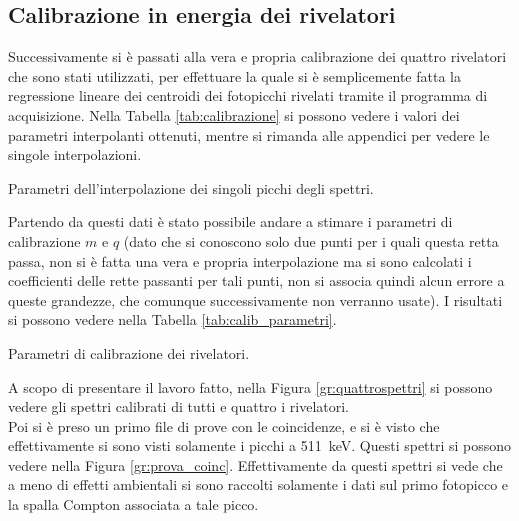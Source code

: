 \subsection{Calibrazione in energia dei rivelatori}

Successivamente si è passati alla vera e propria calibrazione dei quattro rivelatori che sono stati utilizzati, per effettuare la quale si è semplicemente fatta la regressione
lineare dei centroidi dei fotopicchi rivelati tramite il programma di acquisizione. Nella Tabella \ref{tab:calibrazione} si possono vedere i valori dei parametri interpolanti
ottenuti, mentre si rimanda alle appendici per vedere le singole interpolazioni.\\
%
\begin{table}[h]
	\centering
	
	\caption{Parametri dell'interpolazione dei singoli picchi degli spettri.}
	\label{tab:calibrazione}
\end{table}
%

Partendo da questi dati è stato possibile andare a stimare i parametri di calibrazione $m$ e $q$ (dato che si conoscono solo due punti per i quali questa retta passa,
non si è fatta una vera e propria interpolazione ma si sono calcolati i coefficienti delle rette passanti per tali punti, non si associa quindi alcun errore a queste
grandezze, che comunque successivamente non verranno usate). I risultati si possono vedere nella Tabella \ref{tab:calib_parametri}.\\
%
\begin{table}[h]
	\centering
	
	\caption{Parametri di calibrazione dei rivelatori.}
	\label{tab:calib_parametri}
\end{table}
%

A scopo di presentare il lavoro fatto, nella Figura \ref{gr:quattrospettri} si possono vedere gli spettri calibrati di tutti e quattro i
rivelatori.\\


Poi si è preso un primo file di prove con le coincidenze, e si è visto che effettivamente si sono visti solamente i picchi a 511~keV. Questi spettri si possono
vedere nella Figura \ref{gr:prova_coinc}. Effettivamente da questi spettri si vede che a meno di effetti ambientali si sono raccolti solamente i dati sul
primo fotopicco e la spalla Compton associata a tale picco.\\



